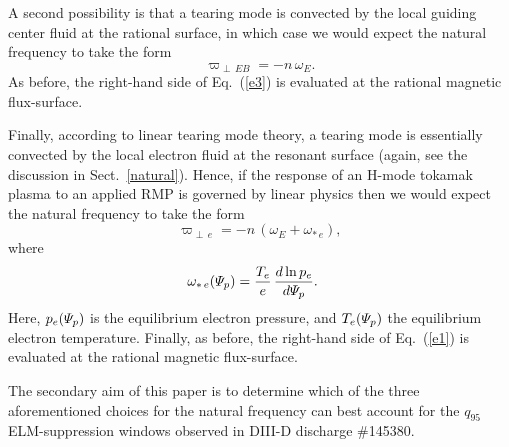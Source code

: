\documentclass[12pt,prb,aps]{revtex4-1}
\begin{document}
A second possibility is that a tearing mode is convected by the local guiding center fluid at the rational surface,\cite{heyn,paz1}
in which case we would expect the natural frequency to take the form 
\begin{equation}\label{e3}
\varpi_{\perp\, EB} =-n\,\omega_E.
\end{equation}
As before, the right-hand side of Eq.~(\ref{e3}) is evaluated
at the rational magnetic flux-surface. 

Finally, according to
linear tearing mode theory, a tearing mode is essentially convected by
the local electron fluid at the resonant surface (again, see the discussion in Sect.~\ref{natural}).\cite{hender,cole} Hence, if the response of an H-mode tokamak plasma to an applied RMP
is governed by linear physics then we would expect the
natural frequency to take the form\,\cite{lin1,lin2,lin3}
\begin{equation}
\varpi_{\perp\,e} = - n\,(\omega_E+\omega_{\ast\,e}),\label{e1}
\end{equation}
where
\begin{align}
\omega_{\ast\,e}({\mit\Psi}_p) &=\frac{T_e}{e}\,\frac{d\ln p_e}{d{\mit\Psi}_p}.
\end{align}
 Here, $p_e({\mit\Psi}_p)$ is the equilibrium
electron pressure, and $T_e({\mit\Psi}_p)$ the equilibrium
electron temperature.
Finally,
as before, the right-hand side of Eq.~(\ref{e1}) is evaluated
at the rational magnetic flux-surface. 


The secondary aim of this paper is to determine which of the three aforementioned choices for the natural frequency can best account for the   $q_{95}$ 
ELM-suppression windows  observed in DIII-D discharge \#145380. 
\end{document}
